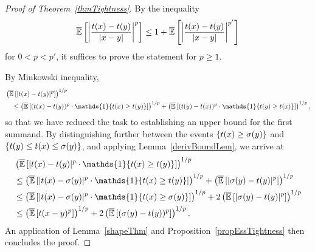 \begin{proof}[Proof of Theorem~\ref{thmTightness}]
By the inequality
$$\overline{\mathbb{E}}\left[\left|\frac{t(x)-t(y)}{|x-y|} \right|^p \right] \leq 1 +  \overline{\mathbb{E}}\left[\left|\frac{t(x)-t(y)}{|x-y|} \right|^{p'} \right]$$
for $0 < p < p'$, it suffices to prove the statement for $p \geq 1$.	
	
	By Minkowski inequality,
\begin{align*}
&\left(\oE\left[|t(x) - t(y)|^p\right]\right)^{1/p}\\&\quad  \leq \left(\oE \left[(t(x) - t(y))^p \cdot \mathds{1}\{t(x) \ge t(y)\}\right]\right)^{1/p} + \left(\oE\left[(t(y) - t(x))^p \cdot \mathds{1}\{t(y) \ge t(x) \} \right]\right)^{1/p},
\end{align*}
	so that we have reduced the task to establishing an upper bound for the first summand. By distinguishing further between the events $\{t(x) \ge \sigma(y)\}$ and $\{t(y) \le t(x) \le \sigma(y)\}$, and applying Lemma~\ref{derivBoundLem}, we arrive at 
	\begin{align*}
	&\left(\oE\left[|t(x) - t(y)|^p\cdot \mathds{1}\{t(x) \ge t(y) \}\right]\right)^{1/p}\\
	&\leq \left(\oE\left[|t(x) - \sigma(y)|^p\cdot \mathds{1}\{t(x) \ge t(y) \}\right]\right)^{1/p} + \left(\oE\left[| \sigma(y)-t(y)|^p\right]\right)^{1/p}\\
		&\leq \left(\oE\left[|t(x) - \sigma(y)|^p\cdot \mathds{1}\{t(x) \ge \sigma(y) \}\right]\right)^{1/p} + 2\left(\oE\left[| \sigma(y)-t(y)|^p\right]\right)^{1/p}\\
	& \leq \left(\oE\left[t(x-y)^p \right] \right)^{1/p} + 2\left(\oE\left[(\sigma(y) - t(y))^p \right] \right)^{1/p}.
	\end{align*}
	An application of Lemma~\ref{shapeThm} and Proposition~\ref{propEssTightness} then concludes the proof.
\end{proof}

%

